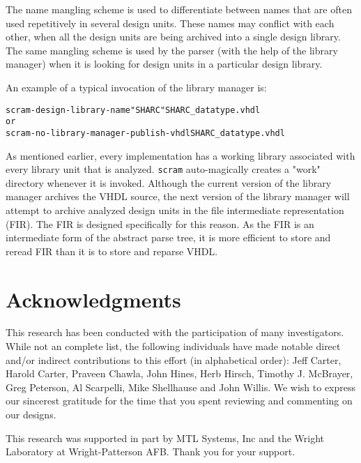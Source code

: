 \documentclass[11pt]{report}
\begin{document}
The name mangling scheme is used to differentiate between names that are
often used repetitively in several design units.  These names may conflict
with each other, when all the design units are being archived into a
single design library.  The same mangling scheme is used by the parser
(with the help of the library manager) when it is looking for design units
in a particular design library.

An example of a typical invocation of the library manager is:

\begin{alltt}
        scram -design-library-name "SHARC" SHARC\_datatype.vhdl
        or
        scram -no-library-manager -publish-vhdl SHARC\_datatype.vhdl
\end{alltt}

As mentioned earlier, every implementation has a working library
associated with every library unit that is analyzed.  \texttt{scram}
auto-magically creates a "work" directory whenever it is invoked.
Although the current version of the library manager archives the VHDL
source, the next version of the library manager will attempt to archive
analyzed design units in the file intermediate representation (FIR).  The
FIR is designed specifically for this reason.  As the FIR is an
intermediate form of the abstract parse tree, it is more efficient to
store and reread FIR than it is to store and reparse VHDL.

\chapter*{Acknowledgments}

This research has been conducted with the participation of many
investigators.  While not an complete list, the following individuals
have made notable direct and/or indirect contributions to this effort
(in alphabetical order):
Jeff Carter,
Harold Carter,
Praveen Chawla,
John Hines,
Herb Hirsch,
Timothy J.  McBrayer,
Greg Peterson,
Al Scarpelli,
Mike Shellhause and
John Willis.
We wish to express our sincerest gratitude for the time that you spent
reviewing and commenting on our designs.

This research was supported in part by MTL Systems, Inc and the Wright
Laboratory at Wright-Patterson AFB.  Thank you for your support.
\end{document}
